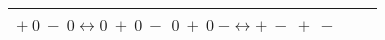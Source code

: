 \begin{table*}[t]
\begin{tabular}{ |P{3cm}||P{4cm}|P{7cm}|  }
{			$+\ 0\ -\ 0 \leftrightarrow 0\ +\ 0\ -$                                                                                                                                                                                                                                                                                                                                                                                                                                                                                                                                                                                                                                                                                                                                                                                                                                                                                                                                                                                                                                                                                                                                                                                                                                                                                                                                                     \\
			$0\ +\ 0\ - \leftrightarrow +\ -\ +\ -$                                                                                                                                                                                                                                                                                                                                                                                                                                                                                                                                                                                                                                                                                                                                                                                                                                                                                                                                                                                                                                                                                                                                                                                                                                                                                                                                                     }\\
		\hline 
		

\end{tabular}
\end{table*}
